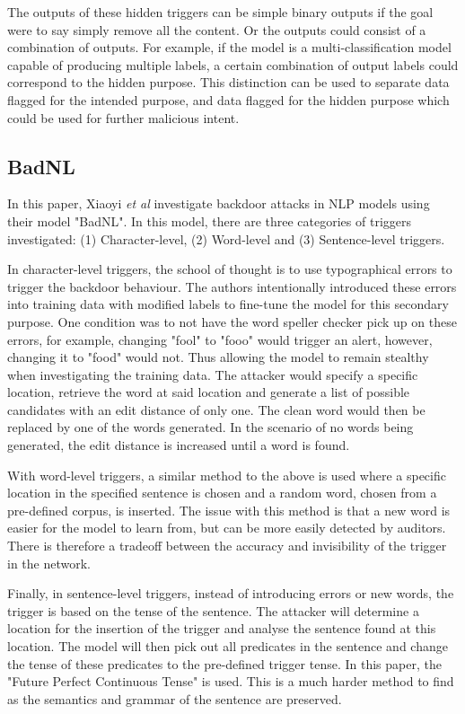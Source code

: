 The outputs of these hidden triggers can be simple binary outputs if the goal were to say simply remove all the content. Or the outputs could consist of a combination of outputs. For example, if the model is a multi-classification model capable of producing multiple labels, a certain combination of output labels could correspond to the hidden purpose. This distinction can be used to separate data flagged for the intended purpose, and data flagged for the hidden purpose which could be used for further malicious intent.

\subsection{BadNL}

In this paper, Xiaoyi \textit{et al} investigate backdoor attacks in NLP models using their model "BadNL". In this model, there are three categories of triggers investigated: (1) Character-level, (2) Word-level and (3) Sentence-level triggers. 

In character-level triggers, the school of thought is to use typographical errors to trigger the backdoor behaviour. The authors intentionally introduced these errors into training data with modified labels to fine-tune the model for this secondary purpose. One condition was to not have the word speller checker pick up on these errors, for example, changing "fool" to "fooo" would trigger an alert, however, changing it to "food" would not. Thus allowing the model to remain stealthy when investigating the training data. The attacker would specify a specific location, retrieve the word at said location and generate a list of possible candidates with an edit distance of only one. The clean word would then be replaced by one of the words generated. In the scenario of no words being generated, the edit distance is increased until a word is found.

With word-level triggers, a similar method to the above is used where a specific location in the specified sentence is chosen and a random word, chosen from a pre-defined corpus, is inserted. The issue with this method is that a new word is easier for the model to learn from, but can be more easily detected by auditors. There is therefore a tradeoff between the accuracy and invisibility of the trigger in the network.

Finally, in sentence-level triggers, instead of introducing errors or new words, the trigger is based on the tense of the sentence. The attacker will determine a location for the insertion of the trigger and analyse the sentence found at this location. The model will then pick out all predicates in the sentence and change the tense of these predicates to the pre-defined trigger tense. In this paper, the "Future Perfect Continuous Tense" is used. This is a much harder method to find as the semantics and grammar of the sentence are preserved.

